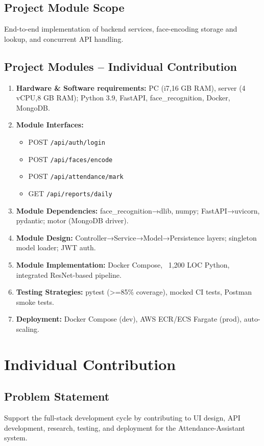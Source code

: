 \documentclass[openany]{report}
\begin{document}
\section{Project Module Scope}
End-to-end implementation of backend services, face-encoding storage and lookup, and concurrent API handling.

\section{Project Modules – Individual Contribution}
\begin{enumerate}
  \item \textbf{Hardware \& Software requirements:} PC (i7,16 GB RAM), server (4 vCPU,8 GB RAM); Python 3.9, FastAPI, face\_recognition, Docker, MongoDB.
  \item \textbf{Module Interfaces:} 
    \begin{itemize}
      \item POST \texttt{/api/auth/login}
      \item POST \texttt{/api/faces/encode}
      \item POST \texttt{/api/attendance/mark}
      \item GET  \texttt{/api/reports/daily}
    \end{itemize}
  \item \textbf{Module Dependencies:} face\_recognition→dlib, numpy; FastAPI→uvicorn, pydantic; motor (MongoDB driver).
  \item \textbf{Module Design:} Controller→Service→Model→Persistence layers; singleton model loader; JWT auth.
  \item \textbf{Module Implementation:} Docker Compose, ~1,200 LOC Python, integrated ResNet-based pipeline.
  \item \textbf{Testing Strategies:} pytest (>=85\% coverage), mocked CI tests, Postman smoke tests.
  \item \textbf{Deployment:} Docker Compose (dev), AWS ECR/ECS Fargate (prod), auto-scaling.
\end{enumerate}
\chapter{Individual Contribution}

\section{Problem Statement}
Support the full-stack development cycle by contributing to UI design, API development, research, testing, and deployment for the Attendance-Assistant system.
\end{document}
